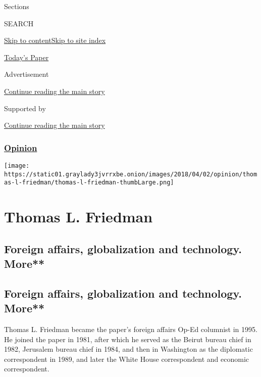 Sections

SEARCH

\protect\hyperlink{site-content}{Skip to
content}\protect\hyperlink{site-index}{Skip to site index}

\href{https://myaccount.nytimes3xbfgragh.onion/auth/login?response_type=cookie\&client_id=vi}{}

\href{https://www.nytimes3xbfgragh.onion/section/todayspaper}{Today's
Paper}

Advertisement

\protect\hyperlink{after-top}{Continue reading the main story}

Supported by

\protect\hyperlink{after-sponsor}{Continue reading the main story}

\hypertarget{opinion}{%
\subsubsection{\texorpdfstring{\href{/section/opinion}{Opinion}}{Opinion}}\label{opinion}}

\texttt{[image: https://static01.graylady3jvrrxbe.onion/images/2018/04/02/opinion/thomas-l-friedman/thomas-l-friedman-thumbLarge.png]}

\hypertarget{thomas-l-friedman}{%
\section{Thomas L. Friedman}\label{thomas-l-friedman}}

\hypertarget{foreign-affairs-globalization-and-technology-more}{%
\subsection{Foreign affairs, globalization and technology.
More**}\label{foreign-affairs-globalization-and-technology-more}}

\hypertarget{foreign-affairs-globalization-and-technology-more-1}{%
\subsection{Foreign affairs, globalization and technology.
More**}\label{foreign-affairs-globalization-and-technology-more-1}}

Thomas L. Friedman became the paper's foreign affairs Op-Ed columnist in
1995. He joined the paper in 1981, after which he served as the Beirut
bureau chief in 1982, Jerusalem bureau chief in 1984, and then in
Washington as the diplomatic correspondent in 1989, and later the White
House correspondent and economic correspondent.

